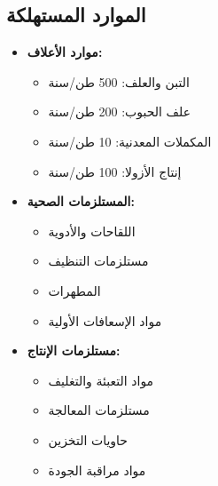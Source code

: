 \subsection{الموارد المستهلكة}
\begin{itemize}
    \item \textbf{موارد الأعلاف:}
    \begin{itemize}
        \item التبن والعلف: 500 طن/سنة
        \item علف الحبوب: 200 طن/سنة
        \item المكملات المعدنية: 10 طن/سنة
        \item إنتاج الأزولا: 100 طن/سنة
    \end{itemize}
    
    \item \textbf{المستلزمات الصحية:}
    \begin{itemize}
        \item اللقاحات والأدوية
        \item مستلزمات التنظيف
        \item المطهرات
        \item مواد الإسعافات الأولية
    \end{itemize}
    
    \item \textbf{مستلزمات الإنتاج:}
    \begin{itemize}
        \item مواد التعبئة والتغليف
        \item مستلزمات المعالجة
        \item حاويات التخزين
        \item مواد مراقبة الجودة
    \end{itemize}
\end{itemize}

